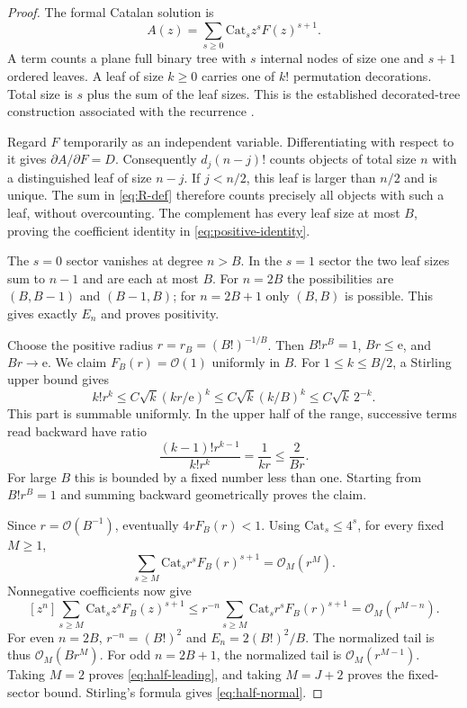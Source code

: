 \documentclass[11pt,letterpaper]{article}
\numberwithin{equation}{section}
\theoremstyle{remark}\newtheorem{remark}[theorem]{Remark}
\newcommand{\e}{\mathrm e}
\newcommand{\Ord}{\mathcal O}
\begin{document}
\begin{proof}
The formal Catalan solution is
\[
 A(z)=\sum_{s\ge0}\mathrm{Cat}_s z^sF(z)^{s+1}.
\]
A term counts a plane full binary tree with $s$ internal nodes of size one and $s+1$ ordered leaves. A leaf of size $k\ge0$ carries one of $k!$ permutation decorations. Total size is $s$ plus the sum of the leaf sizes. This is the established decorated-tree construction associated with the recurrence \cite{fls}.

Regard $F$ temporarily as an independent variable. Differentiating with respect to it gives $\partial A/\partial F=D$. Consequently $d_j(n-j)!$ counts objects of total size $n$ with a distinguished leaf of size $n-j$. If $j<n/2$, this leaf is larger than $n/2$ and is unique. The sum in \eqref{eq:R-def} therefore counts precisely all objects with such a leaf, without overcounting. The complement has every leaf size at most $B$, proving the coefficient identity in \eqref{eq:positive-identity}.

The $s=0$ sector vanishes at degree $n>B$. In the $s=1$ sector the two leaf sizes sum to $n-1$ and are each at most $B$. For $n=2B$ the possibilities are $(B,B-1)$ and $(B-1,B)$; for $n=2B+1$ only $(B,B)$ is possible. This gives exactly $E_n$ and proves positivity.

Choose the positive radius $r=r_B=(B!)^{-1/B}$. Then $B!r^B=1$, $Br\le\e$, and $Br\to\e$. We claim $F_B(r)=\Ord(1)$ uniformly in $B$. For $1\le k\le B/2$, a Stirling upper bound gives
\[
 k!r^k\le C\sqrt{k}(kr/\e)^k
       \le C\sqrt{k}(k/B)^k\le C\sqrt{k}\,2^{-k}.
\]
This part is summable uniformly. In the upper half of the range, successive terms read backward have ratio
\[
 \frac{(k-1)!r^{k-1}}{k!r^k}=\frac1{kr}\le\frac2{Br}.
\]
For large $B$ this is bounded by a fixed number less than one. Starting from $B!r^B=1$ and summing backward geometrically proves the claim.

Since $r=\Ord(B^{-1})$, eventually $4rF_B(r)<1$. Using $\mathrm{Cat}_s\le4^s$, for every fixed $M\ge1$,
\begin{equation}\label{eq:radial-tail}
 \sum_{s\ge M}\mathrm{Cat}_s r^sF_B(r)^{s+1}
       =\Ord_M(r^M).
\end{equation}
Nonnegative coefficients now give
\[
 [z^n]\sum_{s\ge M}\mathrm{Cat}_s z^sF_B(z)^{s+1}
     \le r^{-n}\sum_{s\ge M}\mathrm{Cat}_s r^sF_B(r)^{s+1}
     =\Ord_M(r^{M-n}).
\]
For even $n=2B$, $r^{-n}=(B!)^2$ and $E_n=2(B!)^2/B$. The normalized tail is thus $\Ord_M(Br^M)$. For odd $n=2B+1$, the normalized tail is $\Ord_M(r^{M-1})$. Taking $M=2$ proves \eqref{eq:half-leading}, and taking $M=J+2$ proves the fixed-sector bound. Stirling's formula gives \eqref{eq:half-normal}.
\end{proof}
\end{document}
